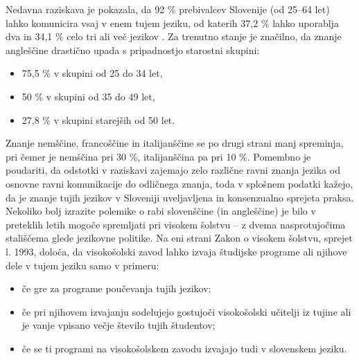 \begin{multicols}{2}

Nedavna raziskava je pokazala, da 92 \% prebivalcev Slovenije (od 25--64 let) lahko komunicira vsaj v enem tujem jeziku, od katerih 37,2 \% lahko uporab\-lja dva in 34,1 \% celo tri ali več jezikov \cite{SURS2}. Za trenutno stanje je značilno, da znanje angleščine drastično upada s pripadnostjo starostni skupini:
\begin{itemize}
\item 75,5 \% v skupini od 25 do 34 let, 
\item 50 \% v skupini od 35 do 49 let, 
\item 27,8 \% v skupini starejših od 50 let.
\end{itemize}
Znanje nemščine, francoščine in itali\-janščine se po drugi strani manj spreminja, pri čemer je nemščina pri 30 \%, itali\-janščina pa pri 10 \%. Pomembno je poudariti, da odstotki v raziskavi zajemajo zelo različne ravni znanja jezika od osnovne ravni komunikacije do odličnega znanja, toda v splošnem podatki kažejo, da je znanje tujih jezikov v Sloveniji uveljav\-ljena in konsenzualno sprejeta praksa.
Nekoliko bolj izrazite polemike o rabi slovenščine (in angleščine) je bilo v preteklih letih mogoče sprem\-ljati pri visokem šolstvu – z dvema nasprotujočima stališ\-čema glede jezikovne politike. Na eni strani Zakon o visokem šolstvu, sprejet l. 1993, določa, da visokošolski zavod lahko izvaja študijske programe ali njihove dele v tujem jeziku samo v primeru:
\begin{itemize}
\item če gre za programe poučevanja tujih jezikov;
\item če pri njihovem izvajanju sodelujejo gostujoči visokošolski učitelji iz tujine ali je vanje vpisano večje število tujih študentov;
\item če se ti programi na visokošolskem zavodu izvajajo tudi v slovenskem jeziku.
\end{itemize}



\end{multicols}
